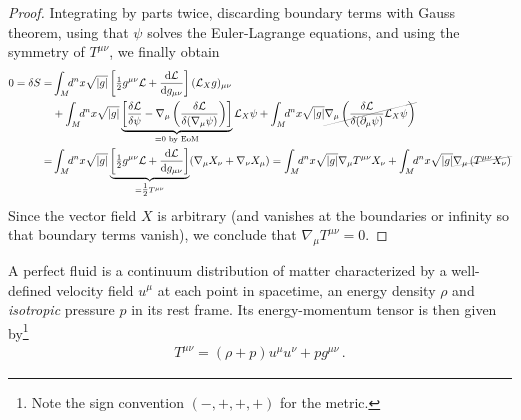 \documentclass[../geometry_main.tex]{subfiles}
\begin{document}
\begin{proof}
Integrating by parts twice, discarding boundary terms with Gauss theorem, using that $\psi$ solves the Euler-Lagrange equations, and using the symmetry of $T^{\mu\nu}$, we finally obtain
{\small
\begin{align}
0= \delta S = & \int_M \!\!d^nx \sqrt{|g|} \left[ \tfrac{1}{2} g^{\mu\nu} \mathcal{L} + \frac{\mathrm{d} \mathcal{L}}{\mathrm{d} g_{\mu\nu}} \right] (\mathcal{L}_X g)_{\mu\nu}
\\
&+ \int_M \!\!d^nx \sqrt{|g|} \underbrace{\left[ \frac{\delta \mathcal{L}}{\delta \psi} - \nabla_\mu \left( \frac{\delta \mathcal{L}}{\delta (\nabla_\mu \psi)} \right) \right]}_{=0 \text{ by EoM}} \mathcal{L}_X \psi + \int_M \!\!d^nx \sqrt{|g|} \graycancel{\nabla_\mu \left( \frac{\delta \mathcal{L}}{\delta (\partial_\mu \psi)} \mathcal{L}_X \psi \right)}
\\
=& \int_M \!\!d^nx \sqrt{|g|} \underbrace{\left[ \tfrac{1}{2} g^{\mu\nu} \mathcal{L} + \frac{\mathrm{d}\mathcal{L}}{\mathrm{d} g_{\mu\nu}} \right]}_{=\tfrac{1}{2}T^{\mu\nu}} (\nabla_\mu X_\nu + \nabla_\nu X_\mu)
= \int_M\!\! d^nx \sqrt{|g|} \nabla_{\mu}T^{\mu\nu} X_\nu 
+ \int_M \!\!d^nx \sqrt{|g|} \graycancel{\nabla_{\mu}\left(T^{\mu\nu}X_\nu\right)}
\end{align}
}
Since the vector field $X$ is arbitrary (and vanishes at the boundaries or infinity so that boundary terms vanish), we conclude that $\nabla_\mu T^{\mu\nu}=0$.
%
\end{proof}


\begin{mytheorem}
%
A perfect fluid is a continuum distribution of matter characterized by a well-defined velocity field $u^\mu$ at each point in spacetime, an energy density $\rho$ and \emph{isotropic} pressure $p$ in its rest frame.
Its energy-momentum tensor is then given by\footnote{Note the sign convention $(-,+,+,+)$ for the metric.}
\begin{align}
    T^{\mu\nu} = (\rho + p) u^\mu u^\nu + p g^{\mu\nu}\,.
\end{align}
%
\end{mytheorem}
\end{document}

